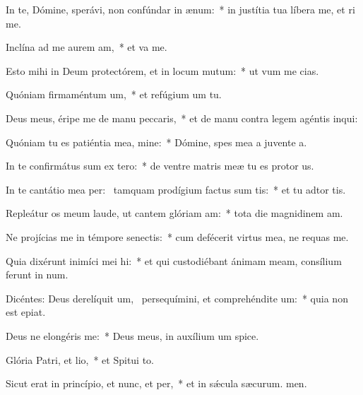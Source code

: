 \item In te, Dómine, sperávi, non confúndar in ænum:~* in justítia tua líbera me, et ri me.
\item Inclína ad me aurem am,~* et va me.
\item Esto mihi in Deum protectórem, et in locum mutum:~* ut vum me cias.
\item Quóniam firmaméntum um,~* et refúgium um  tu.
\item Deus meus, éripe me de manu peccaris,~* et de manu contra legem agéntis  inqui:
\item Quóniam tu es patiéntia mea, mine:~* Dómine, spes mea a juvente a.
\item In te confirmátus sum ex tero:~* de ventre matris meæ tu es protor us.
\item In te cantátio mea per:~\pscross{} tamquam prodígium factus sum tis:~* et tu adtor tis.
\item Repleátur os meum laude, ut cantem glóriam am:~* tota die magnidinem am.
\item Ne projícias me in témpore senectis:~* cum defécerit virtus mea, ne requas me.
\item Quia dixérunt inimíci mei hi:~* et qui custodiébant ánimam meam, consílium ferunt in num.
\item Dicéntes: Deus derelíquit um,~\pscross{} persequímini, et comprehéndite um:~* quia non est  epiat.
\item Deus ne elongéris  me:~* Deus meus, in auxílium um spice.
\item Glória Patri, et lio,~* et Spitui to.
\item Sicut erat in princípio, et nunc, et per,~* et in sǽcula sæcurum. men.
